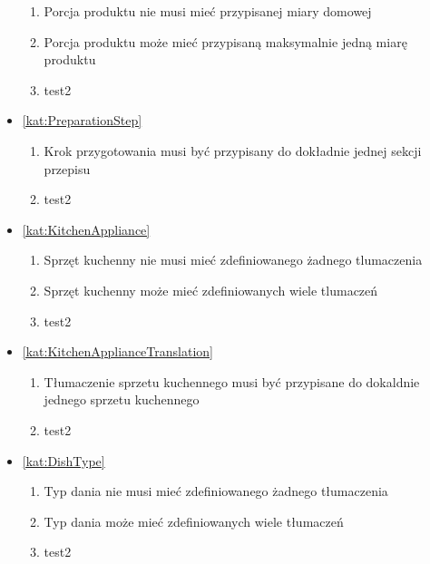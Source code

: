 \begin{itemize}[label={\textbf{Reguły dla}}, wide, labelwidth=!, labelindent=0pt]
\begin{enumerate}[label={\textbf{REG/\protect\threedigits{\arabic{enumi}}}}, wide, labelwidth=!, align=left, leftmargin=3cm, resume]
        \item Porcja produktu nie musi mieć przypisanej miary domowej
        \item Porcja produktu może mieć przypisaną maksymalnie jedną miarę produktu
        \item test2
    \end{enumerate}
    \item\ref{kat:PreparationStep}
    \begin{enumerate}[label={\textbf{REG/\protect\threedigits{\arabic{enumi}}}}, wide, labelwidth=!, align=left, leftmargin=3cm, resume]
        \item Krok przygotowania musi być przypisany do dokładnie jednej sekcji przepisu
        \item test2
    \end{enumerate}
    \item\ref{kat:KitchenAppliance}
    \begin{enumerate}[label={\textbf{REG/\protect\threedigits{\arabic{enumi}}}}, wide, labelwidth=!, align=left, leftmargin=3cm, resume]
        \item Sprzęt kuchenny nie musi mieć zdefiniowanego żadnego tlumaczenia
        \item Sprzęt kuchenny może mieć zdefiniowanych wiele tlumaczeń
        \item test2
    \end{enumerate}
    \item\ref{kat:KitchenApplianceTranslation}
    \begin{enumerate}[label={\textbf{REG/\protect\threedigits{\arabic{enumi}}}}, wide, labelwidth=!, align=left, leftmargin=3cm, resume]
        \item Tłumaczenie sprzetu kuchennego musi być przypisane do dokaldnie jednego sprzetu kuchennego
        \item test2
    \end{enumerate}
    \item\ref{kat:DishType}
    \begin{enumerate}[label={\textbf{REG/\protect\threedigits{\arabic{enumi}}}}, wide, labelwidth=!, align=left, leftmargin=3cm, resume]
        \item Typ dania nie musi mieć zdefiniowanego żadnego tłumaczenia
        \item Typ dania może mieć zdefiniowanych wiele tłumaczeń
        \item test2

\end{enumerate}
\end{itemize}
